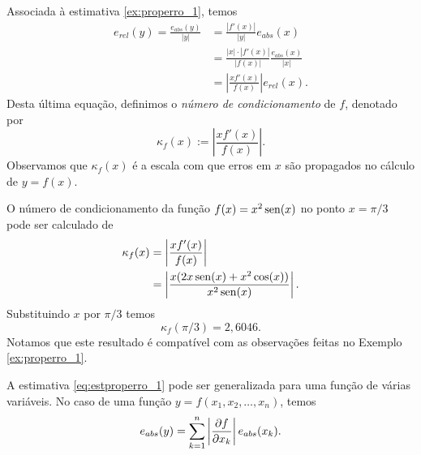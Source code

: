 Associada à estimativa \eqref{ex:properro_1}, temos
\begin{align*}
  e_{rel}(y) = \frac{e_{abs}(y)}{|y|} &= \frac{|f'(x)|}{|y|}e_{abs}(x)\\
  &= \frac{|x|\cdot |f'(x)|}{|f(x)|}\frac{e_{abs}(x)}{|x|}\\
  &= \left|\frac{xf'(x)}{f(x)}\right|e_{rel}(x).
\end{align*}
Desta última equação, definimos o \emph{número de condicionamento} de $f$, denotado por
\begin{equation}
  \kappa_f(x) := \left|\frac{xf'(x)}{f(x)}\right|.
\end{equation}
Observamos que $\kappa_f(x)$ é a escala com que erros em $x$ são propagados no cálculo de $y = f(x)$.

\begin{ex}\label{ex:numcond_1}
  O número de condicionamento da função $f(x) = x^2\operatorname{sen}(x)$ no ponto $x=\pi/3$ pode ser calculado de
  \begin{align}
    \kappa_f(x) &= \left|\frac{xf'(x)}{f(x)}\right|\\
                &= \left|\frac{x(2x\operatorname{sen}(x)+x^2\cos(x))}{x^2\operatorname{sen}(x)}\right|. 
  \end{align}
  Substituindo $x$ por $\pi/3$ temos
  \begin{equation}
    \kappa_f(\pi/3) = 2,6046.
  \end{equation}
  Notamos que este resultado é compatível com as observações feitas no Exemplo \ref{ex:properro_1}.
  
\end{ex}

A estimativa \eqref{eq:estproperro_1} pode ser generalizada para uma função de várias variáveis. No caso de uma função $y = f(x_1,x_2,\dotsc,x_n)$, temos
\begin{equation}\label{eq:estproperro_n}
  e_{abs}(y) = \sum_{k=1}^n \left|\frac{\partial f}{\partial x_k}\right|e_{abs}(x_k).
\end{equation}

